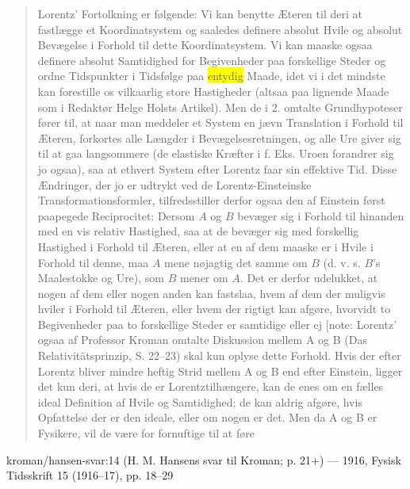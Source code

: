 \documentclass[11pt]{article}
\newcommand{\dcite}[1]{{\nopagebreak\raggedleft\small #1\par}\medskip}
\newcommand{\tlg}[1]{{\setlength{\fboxsep}{0.8pt}\colorbox{yellow}{#1}}}
\begin{document}
\begin{quote}
Lorentz' Fortolkning er følgende: Vi kan benytte Æteren til deri
at fastlægge et Koordinatsystem og saaledes definere absolut Hvile og
absolut Bevægelse i Forhold til dette Koordinatsystem. Vi kan maaske
ogsaa definere absolut Samtidighed for Begivenheder paa forskellige
Steder og ordne Tidspunkter i Tidsfølge paa \tlg{entydig} Maade, idet vi i
det mindste kan forestille os vilkaarlig store Hastigheder (altsaa paa
lignende Maade som i Redaktør Helge Holsts Artikel). Men de i
2. omtalte Grundhypoteser fører til, at naar man meddeler et System en
jævn Translation i Forhold til Æteren, forkortes alle Længder i
Bevægelsesretningen, og alle Ure giver sig til at gaa langsommere (de
elastiske Kræfter i f. Eks. Uroen forandrer sig jo ogsaa), saa at
ethvert System efter Lorentz faar sin effektive
Tid. Disse Ændringer, der jo er udtrykt ved de
Lorentz-Einsteinske Transformationsformler, tilfredsstiller derfor
ogsaa den af Einstein først paapegede Reciprocitet: Dersom $A$ og $B$
bevæger sig i Forhold til hinanden med en vis relativ Hastighed, saa at
de bevæger sig med forskellig Hastighed i Forhold til Æteren, eller at
en af dem maaske er i Hvile i Forhold til denne, maa $A$ mene nøjagtig
det samme om $B$ (d. v. s. $B$'s Maalestokke og Ure), som $B$ mener om
$A$. Det er derfor udelukket, at nogen af dem eller nogen anden
kan fastslaa, hvem af dem der muligvis hviler i Forhold til
Æteren, eller hvem der rigtigt kan afgøre, hvorvidt to Begivenheder paa
to forskellige Steder er samtidige eller ej [note: Lorentz' ogsaa af
Professor Kroman omtalte Diskussion mellem A og B (Das
Relativitätsprinzip, S. 22–23) skal kun oplyse dette Forhold. Hvis der
efter Lorentz bliver mindre heftig Strid mellem A og B end efter
Einstein, ligger det kun deri, at hvis de er Lorentztilhængere, kan de
enes om en fælles ideal Definition af Hvile og Samtidighed; de kan
aldrig afgøre, hvis Opfattelse der er den ideale, eller om nogen er
det. Men da A og B er Fysikere, vil de være for fornuftige til at føre
\end{quote}
\dcite{kroman/hansen-svar:14  (H. M. Hansens svar til Kroman; p. 21+) — 1916, Fysisk Tidsskrift 15 (1916–17), pp. 18–29}
\end{document}

